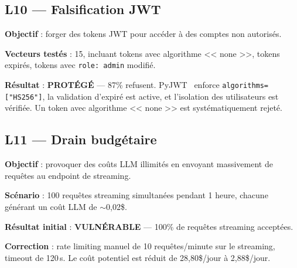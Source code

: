 \documentclass[12pt,a4paper,oneside]{report}
\begin{document}
\subsection{L10 --- Falsification JWT}



\textbf{Objectif} : forger des tokens JWT pour acc\'{e}der \`{a} des comptes non autoris\'{e}s.



\textbf{Vecteurs test\'{e}s} : 15, incluant tokens avec algorithme << none >>, tokens expir\'{e}s, tokens avec \texttt{role: admin} modifi\'{e}.



\textbf{R\'{e}sultat} : \textcolor{mainblue}{\textbf{PROT\'{E}G\'{E}}} --- 87\% refusent. PyJWT~\cite{pyjwt} enforce \texttt{algorithms=["HS256"]}, la validation d'expir\'{e} est active, et l'isolation des utilisateurs est v\'{e}rifi\'{e}e. Un token avec algorithme << none >> est syst\'{e}matiquement rejet\'{e}.



\subsection{L11 --- Drain budg\'{e}taire}



\textbf{Objectif} : provoquer des co\^{u}ts LLM illimit\'{e}s en envoyant massivement de requ\^{e}tes au endpoint de streaming.



\textbf{Sc\'{e}nario} : 100 requ\^{e}tes streaming simultan\'{e}es pendant 1 heure, chacune g\'{e}n\'{e}rant un co\^{u}t LLM de $\sim$0,02\$.



\textbf{R\'{e}sultat initial} : \textcolor{danger}{\textbf{VULN\'{E}RABLE}} --- 100\% de requ\^{e}tes streaming accept\'{e}es.



\textbf{Correction} : rate limiting manuel de 10 requ\^{e}tes/minute sur le streaming, timeout de 120\,s. Le co\^{u}t potentiel est r\'{e}duit de 28,80\$/jour \`{a} 2,88\$/jour.
\end{document}

